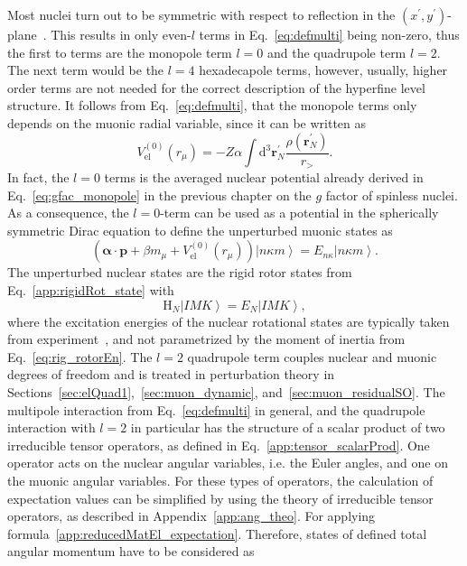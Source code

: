 Most nuclei turn out to be symmetric with respect to reflection in the $(x^\prime ,y^\prime)$-plane~\cite{zickendraht1991}. This results in only even-$l$ terms in Eq.~\eqref{eq:defmulti} being non-zero, thus the first to terms are the monopole term $l=0$ and the quadrupole term $l=2$. The next term would be the $l=4$ hexadecapole terms, however, usually, higher order terms are not needed for the correct description of the hyperfine level structure. It follows from Eq.~\eqref{eq:defmulti}, that the monopole terms only depends on the muonic radial variable, since it can be written as
\begin{equation}
V_{\text{el}}^{(0)}(r_\mu)=-Z\alpha \int\text{d}^3\mathbf{r}_N^\prime \frac{\rho(\mathbf{r}_N^\prime)}{r_>}.
\end{equation}
In fact, the $l=0$ terms is the averaged nuclear potential already derived in Eq.~\eqref{eq:gfac_monopole} in the previous chapter on the $g$ factor of spinless nuclei. As a consequence, the $l=0$-term can be used as a potential in the spherically symmetric Dirac equation to define the unperturbed muonic states as
\begin{equation}
\label{eq:muonicEn}
\left(\boldsymbol{\alpha} \cdot \mathbf{p} + \beta m_\mu + V_{\text{el}}^{(0)}(r_\mu) \right) \left|n\kappa m\right> = E_{n\kappa}\left|n\kappa m\right>.
\end{equation}
The unperturbed nuclear states are the rigid rotor states from Eq.~\eqref{app:rigidRot_state} with
\begin{equation}
\label{eq:nuclEn}
\text{H}_N \left|IMK\right> = E_N \left|IMK\right>,
\end{equation}
where the excitation energies of the nuclear rotational states are typically taken from experiment~\cite{ENSDF}, and not parametrized by the moment of inertia from Eq.~\eqref{eq:rig_rotorEn}.
The $l=2$ quadrupole term couples nuclear and muonic degrees of freedom and is treated in perturbation theory in Sections~\ref{sec:elQuad1},~\ref{sec:muon_dynamic}, and~\ref{sec:muon_residualSO}. The multipole interaction from Eq.~\eqref{eq:defmulti} in general, and the quadrupole interaction with $l=2$ in particular has the structure of a scalar product of two irreducible tensor operators, as defined in Eq.~\eqref{app:tensor_scalarProd}. One operator acts on the nuclear angular variables, i.e. the Euler angles, and one on the muonic angular variables.
For these types of operators, the calculation of expectation values can be simplified by using the theory of irreducible tensor operators, as described in Appendix~\ref{app:ang_theo}. For applying formula~\eqref{app:reducedMatEl_expectation}. Therefore, states of defined total angular momentum have to be considered as
